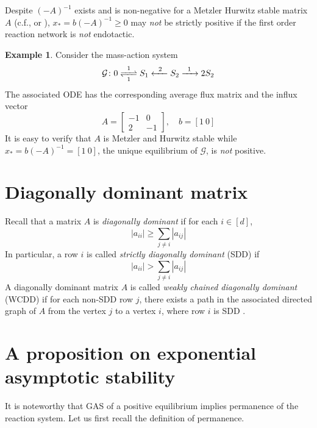 \documentclass[10pt]{amsart}
\numberwithin{equation}{section}
\theoremstyle{plain}
\theoremstyle{definition}
\newtheorem{example}[theorem]{Example}
\theoremstyle{remark}
\newcommand{\cG}{\mathcal{G}}
\begin{document}
Despite $(-A)^{-1}$ exists and is non-negative for a Metzler Hurwitz stable matrix $A$ (c.f.,  \cite[Theorem~2.5.3]{HJ94} or \cite[Chapter 6, Theorem~2.3]{BP94}), $x_*=b(-A)^{-1}\ge0$ may \emph{not} be strictly positive if the first order reaction network is \emph{not} endotactic.
\begin{example}
Consider the mass-action system
\[\cG\colon 0\ce{<=>[1][1]}S_1\ce{<-[2]}S_2\ce{->[1]}2S_2\]
The associated ODE has the corresponding average flux matrix and the influx vector \[A=\begin{bmatrix}
-1&0\\
2&-1\end{bmatrix},\quad b=[1\ 0]\]
It is easy to verify that $A$ is Metzler and Hurwitz stable while  $x_*=b(-A)^{-1}=[1\ 0]$, the unique equilibrium  of $\cG$,   is \emph{not} positive.
\end{example}


\section{Diagonally dominant matrix}
Recall that a matrix $A$ is \emph{diagonally dominant} if for each $i\in[d]$,
\begin{equation*}
|a_{ii}|\ge\sum_{j\neq i}|a_{ij}|
\end{equation*}
In particular, a row $i$ is called \emph{strictly diagonally dominant} (SDD) if \begin{equation*}
|a_{ii}|>\sum_{j\neq i}|a_{ij}|
\end{equation*}
A diagonally dominant matrix $A$ is called \emph{weakly chained diagonally dominant} (WCDD) if for each non-SDD row $j$, there exists a path in the associated directed graph of $A$ from the vertex $j$ to a vertex $i$, where row $i$ is SDD \cite{BH64,SC74,AF16}. 
\section{A proposition on exponential asymptotic stability}\label{sect:GAS}
 
It is noteworthy that GAS of a positive equilibrium implies permanence of the reaction system. Let us first recall the definition of permanence.
\end{document}
